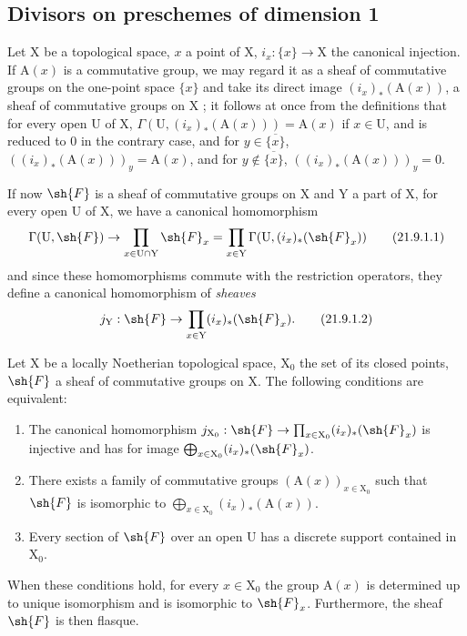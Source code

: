 \subsection{Divisors on preschemes of dimension 1}
\label{subsection:IV.21.9}

\begin{env}[21.9.1]
\label{IV.21.9.1}
Let $\mathrm{X}$ be a topological space, $x$ a point of $\mathrm{X}$, $i_x:\{x\}\to\mathrm{X}$ the canonical injection.
If $\mathrm{A}(x)$ is a commutative group, we may regard it as a sheaf of commutative groups on the one-point space $\{x\}$ and take its direct image $(i_x)_*(\mathrm{A}(x))$, a sheaf of commutative groups on $\mathrm{X}$ ;
it follows at once from the definitions that for every open $\mathrm{U}$ of $\mathrm{X}$, $\Gamma(\mathrm{U},(i_x)_*(\mathrm{A}(x)))=\mathrm{A}(x)$ if $x\in\mathrm{U}$, and is reduced to $0$ in the contrary case, and for $y\in\overline{\{x\}}$, $((i_x)_*(\mathrm{A}(x)))_y=\mathrm{A}(x)$, and for $y\notin\overline{\{x\}}$, $((i_x)_*(\mathrm{A}(x)))_y=0$.

If now $\sh{F}$ is a sheaf of commutative groups on $\mathrm{X}$ and $\mathrm{Y}$ a part of $\mathrm{X}$, for every open $\mathrm{U}$ of $\mathrm{X}$, we have a canonical homomorphism
\[
\label{IV.21.9.1.1}
  \Gamma(\mathrm{U},\sh{F})\to\prod_{x\in\mathrm{U}\cap\mathrm{Y}}\sh{F}_x=\prod_{x\in\mathrm{Y}}\Gamma(\mathrm{U},(i_x)_*(\sh{F}_x))
  \tag{21.9.1.1}
\]
and since these homomorphisms commute with the restriction operators, they define a canonical homomorphism of \emph{sheaves}
\[
\label{IV.21.9.1.2}
  j_\mathrm{Y}:\sh{F}\to\prod_{x\in\mathrm{Y}}(i_x)_*(\sh{F}_x).
  \tag{21.9.1.2}
\]
\end{env}

\begin{lemma}[21.9.2]
\label{IV.21.9.2}
Let $\mathrm{X}$ be a locally Noetherian topological space, $\mathrm{X}_0$ the set of its closed points, $\sh{F}$ a sheaf of commutative groups on $\mathrm{X}$.
The following conditions are equivalent:
\begin{enumerate}[label=\emph{\alph*)}]
  \item The canonical homomorphism $j_{\mathrm{X}_0}:\sh{F}\to\prod_{x\in\mathrm{X}_0}(i_x)_*(\sh{F}_x)$ is injective and has for image $\bigoplus_{x\in\mathrm{X}_0}(i_x)_*(\sh{F}_x)$.
  \item[\rm a$'$)] There exists a family of commutative groups $(\mathrm{A}(x))_{x\in\mathrm{X}_0}$ such that $\sh{F}$ is isomorphic to $\bigoplus_{x\in\mathrm{X}_0}(i_x)_*(\mathrm{A}(x))$.
  \item Every section of $\sh{F}$ over an open $\mathrm{U}$ has a discrete support contained in $\mathrm{X}_0$.
\end{enumerate}
When these conditions hold, for every $x\in\mathrm{X}_0$ the group $\mathrm{A}(x)$ is determined up to unique isomorphism and is isomorphic to $\sh{F}_x$.
Furthermore, the sheaf $\sh{F}$ is then flasque.
\end{lemma}


